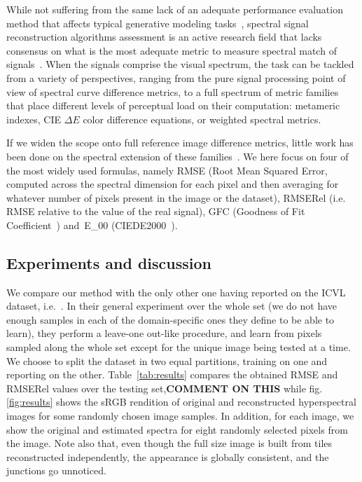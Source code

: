 \documentclass{bmvc2k}
\begin{document}
While not suffering from the same lack of an adequate performance evaluation method that affects typical generative modeling tasks~\cite{theis_note_2015}, spectral signal reconstruction algorithms assessment is an active research field that lacks consensus on what is the most adequate metric to measure spectral match of signals~\cite{imai_comparative_2002}.
When the signals comprise the visual spectrum, the task can be tackled from a variety of perspectives, ranging from the pure signal processing point of view of spectral curve difference metrics, to a full spectrum of metric families that place different levels of perceptual load on their computation: metameric indexes, CIE $\Delta E$ color difference equations, or weighted spectral metrics.

If we widen the scope onto full reference image difference metrics, little work has been done on the spectral extension of these families~\cite{moan_image-difference_2014}. We here focus on four of the most widely used formulas, namely RMSE (Root Mean Squared Error, computed across the spectral dimension for each pixel and then averaging for whatever number of pixels present in the image or the dataset), RMSERel (i.e. RMSE relative to the value of the real signal), GFC (Goodness of Fit Coefficient~\cite{romero1997linear}) and~\Delta E_{00} (CIEDE2000~\cite{cie_cie_2001}).

\subsection{Experiments and discussion}
We compare our method with the only other one having reported on the ICVL dataset, i.e.~\cite{arad_sparse_2016}. In their general experiment over the whole set (we do not have enough samples in each of the domain-specific ones they define to be able to learn), they perform a leave-one out-like procedure, and learn from pixels sampled along the whole set except for the unique image being tested at a time. We choose to split the dataset in two equal partitions, training on one and reporting on the other. Table~\ref{tab:results} compares the obtained RMSE and RMSERel values over the testing set,\textbf{COMMENT ON THIS} while fig.\ref{fig:results} shows the sRGB rendition of original and reconstructed hyperspectral images for some randomly chosen image samples. In addition, for each image, we show the original and estimated spectra for eight randomly selected pixels from the image. Note also that, even though the full size image is built from tiles reconstructed independently, the appearance is globally consistent, and the junctions go unnoticed.
\end{document}
